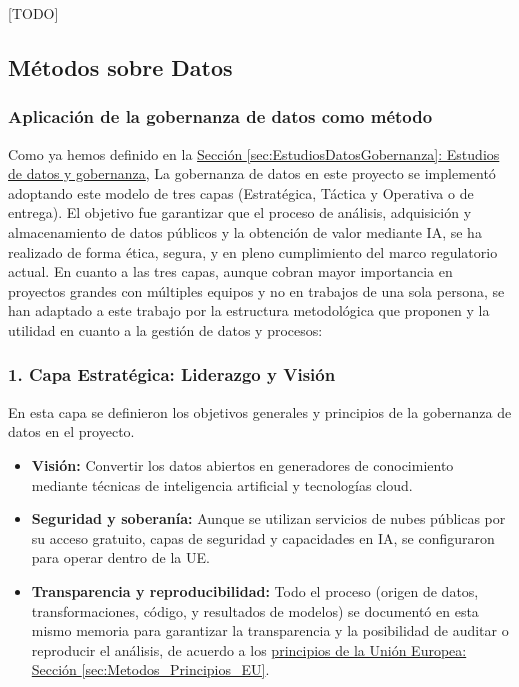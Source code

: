 [TODO]

\subsection{Métodos sobre Datos} \label{sec:Materiales_datos}

\subsubsection{Aplicación de la gobernanza de datos como método}  \label{sec:Metodos_Gobernanza}

Como ya hemos definido en la \hyperref[sec:EstudiosDatosGobernanza]{Sección \ref*{sec:EstudiosDatosGobernanza}: Estudios de datos y gobernanza}, La gobernanza de datos en este proyecto se implementó adoptando este modelo de tres capas (Estratégica, Táctica y Operativa o de entrega). El objetivo fue garantizar que el proceso de análisis, adquisición y almacenamiento de datos públicos y la obtención de valor mediante IA, se ha realizado de forma ética, segura, y en pleno cumplimiento del marco regulatorio actual. En cuanto a las tres capas, aunque cobran mayor importancia en proyectos grandes con múltiples equipos y no en trabajos de una sola persona, se han adaptado a este trabajo por la estructura metodológica que proponen y la utilidad en cuanto a la gestión de datos y procesos:

\subsubsection*{1. Capa Estratégica: Liderazgo y Visión}

En esta capa se definieron los objetivos generales y principios de la gobernanza de datos en el proyecto.

\begin{itemize}
	\item \textbf{Visión:} Convertir los datos abiertos en generadores de conocimiento mediante técnicas de inteligencia artificial y tecnologías cloud.
	
	\item \textbf{Seguridad y soberanía:} Aunque se utilizan servicios de nubes públicas por su acceso gratuito, capas de seguridad y capacidades en IA, se configuraron para operar dentro de la UE.
	
	\item \textbf{Transparencia y reproducibilidad:} Todo el proceso (origen de datos, transformaciones, código, y resultados de modelos) se documentó en esta mismo memoria para garantizar la transparencia y la posibilidad de auditar o reproducir el análisis, de acuerdo a los \hyperref[sec:Metodos_Principios_EU]{principios de la Unión Europea: Sección \ref*{sec:Metodos_Principios_EU}}.
\end{itemize}


